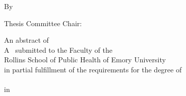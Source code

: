 
\vspace*{\fill}

\begin{singlespace}
    \begin{center}
        \mytitle
        
        \vspace{0.7in}
        
        By
        
        \vspace{0.7in}
        
        \myname
        \mypreviousdegrees
        
        \vspace{0.75in}
        
        Thesis Committee Chair: \advisor
        
        \vspace{2.5in}
        
        An abstract of\\
        A \mydoctype~submitted to the Faculty of the\\
        Rollins School of Public Health of Emory University\\
        in partial fulfillment of the requirements for the degree of \\
        \mydegree\\
        in \mydepartment\\
        \myyear
    \end{center}
\end{singlespace}

\vfill
\newpage
